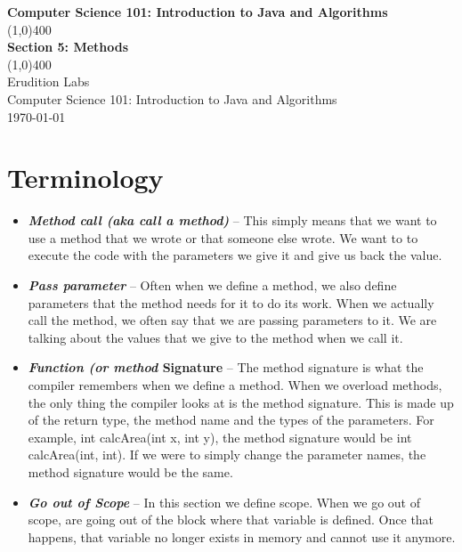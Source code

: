 \documentclass[11]{article}
\begin{document}
\begin{titlepage}
\begin{center}
\vspace{1cm}
\Large{\textbf{Computer Science 101: Introduction to Java and Algorithms}}\\
\vfill
\line(1,0){400}\\
\huge{\textbf{Section 5: Methods}}\\
\line(1,0){400}\\
\vfill
Erudition Labs\\
Computer Science 101: Introduction to Java and Algorithms\\
\today\\
\end{center}
\end{titlepage}

\tableofcontents
\thispagestyle{empty}
\clearpage
\setcounter{page}{1}

\section{Terminology}
\begin{itemize}
  \item \textbf{\textit{Method call (aka call a method)}} --
  This simply means that we want to use a method that we wrote or that someone else wrote. We want to to execute the code with the parameters we give it and give us back the value.

  \item \textbf{\textit{Pass parameter}} --
  Often when we define a method, we also define parameters that the method needs for it to do its work. When we actually call the method, we often say that we are passing parameters to it. We are talking about the values that we give to the method when we call it.
  
  \item \textbf{\textit{Function (or method} Signature} --
  The method signature is what the compiler remembers when we define a method. When we overload methods, the only thing the compiler looks at is the method signature. This is made up of the return type, the method name and the types of the parameters. For example, int calcArea(int x, int y), the method signature would be int calcArea(int, int). If we were to simply change the parameter names, the method signature would be the same.
  
  \item \textbf{\textit{Go out of Scope}} --
	In this section we define scope. When we go out of scope, are going out of the block where that variable is defined. Once that happens, that variable no longer exists in memory and cannot use it anymore.
  
\end{itemize}
\end{document}
